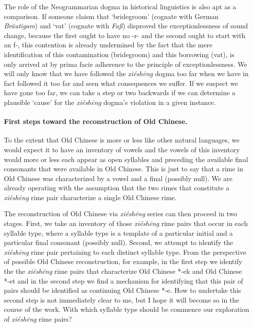 The role of the Neogrammarian dogma in historical linguistics is also apt as a comparison. If someone claism that `bridegroom' (cognate with German \textit{Bräutigam}) and `vat' (cognate with \textit{Faß}) disproved the exceptionlessness of sound change, because the first ought to have no -r- and the second ought to start with an f-, this  contention is already undermined by the fact that the mere identification of this contamination (bridegroom) and this borrowing (vat), is only arrived at by prima facie adherence to the principle of exceptionlessness. 
We will only know that we have followed the \textit{xiéshēng} dogma too far when we have in fact followed it too far and seen what consequences we suffer. If we suspect we have gone too far, we can take a step or two backwards if we can determine a plausible `cause' for the  \textit{xiéshēng} dogma's violation in a given instance.

\paragraph{First steps toward the reconstruction of Old Chinese.}
\label{par:first-steps}
To the extent that Old Chinese is more or less like other natural languages, we would expect it to have an inventory of vowels and the vowels of this inventory would more or less each appear as open syllables and preceding the available final consonants that were available in Old Chinese. This is just to say that a rime in Old Chinese was characterized by a vowel and a final (possibly null). We are already operating with the assumption that the two rimes that constitute a \textit{xiéshēng} rime pair characterize a single Old Chinese rime. 

The reconstruction of Old Chinese via \textit{xiéshēng} series can then proceed in two stages. First, we take an inventory of those  \textit{xiéshēng} rime pairs that occur in each syllable type, where a syllable type is a template of a particular initial and a particular final consonant (possibly null). Second, we attempt to identify the \textit{xiéshēng} rime pair pertaining to each distinct syllable type. From the perspective of possible Old Chinese reconstruction, for example, in the first step we identify the the \textit{xiéshēng} rime pairs that characterize Old Chinese *-ek and Old Chinese *-et and in the second step we find a mechanism for identifying that this pair of pairs should be identified as continuing Old Chinese *-e. How to undertake this second step is not immediately clear to me, but I hope it will become so in the course of the work. With which syllable type should be commence our exploration of  \textit{xiéshēng} rime pairs?

